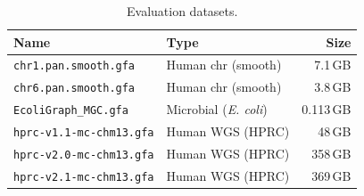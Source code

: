 \begin{table}[t]
  \caption{Evaluation datasets.}
  \label{tab:datasets}
  \setlength{\tabcolsep}{6pt}
  \renewcommand{\arraystretch}{0.95}
  \begin{tabular}{@{}l l r@{}}
    \hline
    \textbf{Name}                   & \textbf{Type}              & \textbf{Size} \\
    \hline
    \texttt{chr1.pan.smooth.gfa}    & Human chr (smooth)         & 7.1\,GB       \\
    \texttt{chr6.pan.smooth.gfa}    & Human chr (smooth)         & 3.8\,GB       \\
    \texttt{EcoliGraph\_MGC.gfa}    & Microbial (\emph{E. coli}) & 0.113\,GB     \\
    \texttt{hprc-v1.1-mc-chm13.gfa} & Human WGS (HPRC)           & 48\,GB        \\
    \texttt{hprc-v2.0-mc-chm13.gfa} & Human WGS (HPRC)           & 358\,GB       \\
    \texttt{hprc-v2.1-mc-chm13.gfa} & Human WGS (HPRC)           & 369\,GB       \\
    \hline
  \end{tabular}
\end{table}





